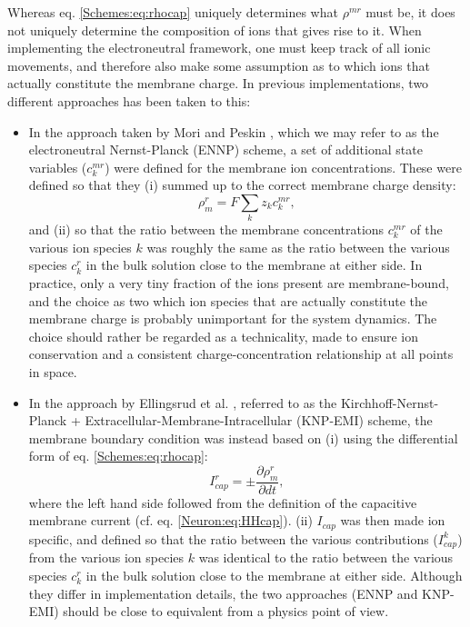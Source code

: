 Whereas eq. \ref{Schemes:eq:rhocap} uniquely determines what  $\rho^{mr}$ must be, it does not uniquely determine the composition of ions that gives rise to it. When implementing the electroneutral framework, one must keep track of all ionic movements, and therefore also make some assumption as to which ions that actually constitute the membrane charge. In previous implementations, two different approaches has been taken to this:

\begin{itemize}

\item In the approach taken by Mori and Peskin \cite{Mori2006, Mori2009}, which we may refer to as the electroneutral Nernst-Planck (ENNP) scheme, a set of additional state variables ($c_k^{mr}$) were defined for the membrane ion concentrations. These were defined so that they (i) summed up to the correct membrane charge density: 
\begin{equation}
\rho_{m}^r = F \sum_k z_k c_k^{mr},
\label{Schemes:eq:rhomem}
\end{equation}
and (ii) so that the ratio between the membrane concentrations $c_k^{mr}$ of the various ion species $k$ was roughly the same as the ratio between the various species $c_k^r$ in the bulk solution close to the membrane at either side. In practice, only a very tiny fraction of the ions present are membrane-bound, and the choice as two which ion species that are actually constitute the membrane charge is probably unimportant for the system dynamics. The choice should rather be regarded as a technicality, made to ensure ion conservation and a consistent charge-concentration relationship at all points in space. 

\item In the approach by Ellingsrud et al. \cite{ellingsrud2020}, referred to as the Kirchhoff-Nernst-Planck + Extracellular-Membrane-Intracellular (KNP-EMI) scheme, the membrane boundary condition was instead based on (i) using the differential form of eq. \ref{Schemes:eq:rhocap}:
\begin{equation}
I_{cap}^r = \pm \frac{\partial \rho_{m}^r}{\partial dt}, 
\label{Schemes:eq:rhocap2}
\end{equation}
where the left hand side followed from the definition of the capacitive membrane current (cf. eq. \ref{Neuron:eq:HHcap}). (ii) $I_{cap}$ was then made ion specific, and defined so that the ratio between the various contributions ($I^k_{cap}$) from the various ion species $k$ was identical to the ratio between the various species $c_k^r$ in the bulk solution close to the membrane at either side. Although they differ in implementation details, the two approaches (ENNP and KNP-EMI) should be close to equivalent from a physics point of view.
\end{itemize}

